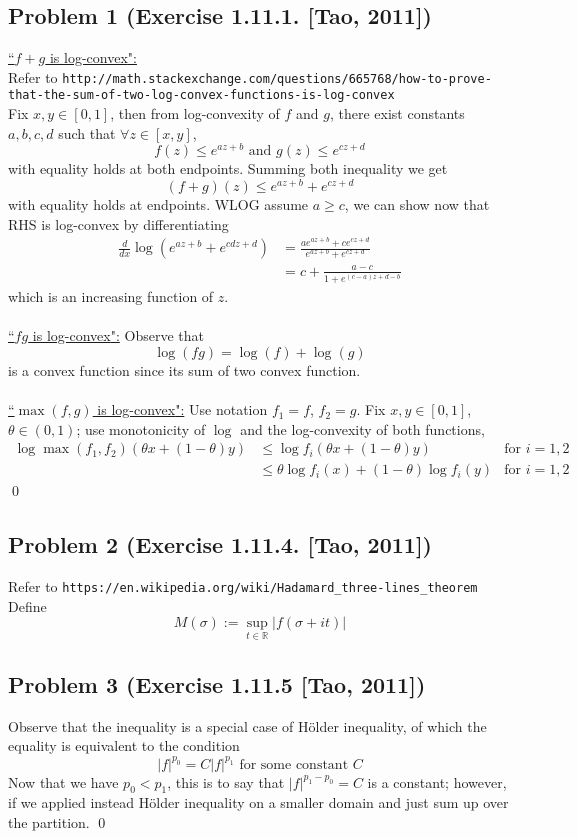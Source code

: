 \documentclass[12pt,a4paper]{article}
\newcommand{\claim}[1]{\underline{``{#1}":}}
\newcommand{\bga}{\begin{align*}}
\renewcommand{\l}{\left}\renewcommand{\r}{\right}
\newcommand{\R}{\mathbb R}%
\begin{document}
\subsection*{Problem 1 (Exercise 1.11.1. [Tao, 2011])}
\claim{$f+g$ is log-convex} \\
Refer to \texttt{http://math.stackexchange.com/questions/665768/how-to-prove-that-the-sum-of-two-log-convex-functions-is-log-convex} \\
Fix $x, y \in [0, 1]$, then from log-convexity of $f$ and $g$, there exist constants $a, b, c, d$ such that $\forall z \in [x, y]$, 
$$f(z) \leq e^{az+b} \text{ and } g(z) \leq e^{cz + d}$$
with equality holds at both endpoints. Summing both inequality we get 
$$(f+g)(z) \leq e^{az+b} + e^{cz + d}$$ with equality holds at endpoints. WLOG assume $a \geq c$, we can show now that RHS is log-convex by differentiating
\bga
\frac{d}{dx} \log \l(e^{az+b} + e^{cdz + d}\r)
& = \frac{a e^{a z+b}+c e^{c z+d}}{e^{a z+b}+e^{c z+d}} \\
& =c+\frac{a -c  }{1+e^{(c-a) z+d-b}}
\end{align*}
which is an increasing function of $z$.\\
\\
\claim{$fg$ is log-convex} Observe that 
$$\log(fg) = \log(f) + \log(g)$$
is a convex function since its sum of two convex function. \\
\\
\claim{$\max(f, g)$ is log-convex} Use notation $f_1 = f$, $f_2 = g$. Fix $x, y \in [0, 1]$, $\theta \in (0, 1)$; use monotonicity of $\log$ and the log-convexity of both functions, 
\bga
\log\max(f_1, f_2)(\theta x + (1-\theta)y) 
& \leq \log f_i(\theta x + (1-\theta)y) & \text{for } i = 1, 2\\
& \leq \theta \log f_i(x) + (1-\theta)\log f_i(y) & \text{for } i=1,2
\end{align*}\qed


\newpage\subsection*{Problem 2 (Exercise 1.11.4. [Tao, 2011])} 
Refer to \texttt{https://en.wikipedia.org/wiki/Hadamard\_three-lines\_theorem} \\
Define 
$$M(\sigma) := \sup_{t\in\R} |f(\sigma + it)|$$



\newpage\subsection*{Problem 3 (Exercise 1.11.5 [Tao, 2011])} 
Observe that the inequality is a special case of H\"older inequality, of which the equality is equivalent to the condition
$$|f|^{p_0} = C|f|^{p_1} \text{ for some constant } C$$
Now that we have $p_0 < p_1$, this is to say that $|f|^{p_1 - p_0} = C$ is a constant; however, if we applied instead H\"older inequality on a smaller domain and just sum up over the partition. \qed
\end{document}

